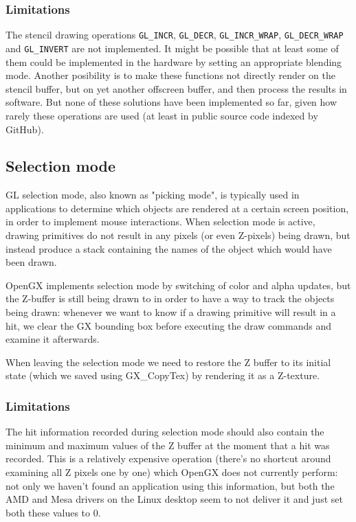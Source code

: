 \documentclass[12pt]{article}
\begin{document}
\subsubsection {Limitations}
\label{sec:stencillimitations}

The stencil drawing operations \lstinline{GL_INCR}, \lstinline{GL_DECR}, \lstinline{GL_INCR_WRAP}, \lstinline{GL_DECR_WRAP} and \lstinline{GL_INVERT} are not implemented. It might be possible that at least some of them could be implemented in the hardware by setting an appropriate blending mode. Another posibility is to make these functions not directly render on the stencil buffer, but on yet another offscreen buffer, and then process the results in software. But none of these solutions have been implemented so far, given how rarely these operations are used (at least in public source code indexed by GitHub).


\subsection {Selection mode}

GL selection mode, also known as "picking mode", is typically used in applications to determine which objects are rendered at a certain screen position, in order to implement mouse interactions. When selection mode is active, drawing primitives do not result in any pixels (or even Z-pixels) being drawn, but instead produce a stack containing the names of the object which would have been drawn.

OpenGX implements selection mode by switching of color and alpha updates, but the Z-buffer is still being drawn to in order to have a way to track the objects being drawn: whenever we want to know if a drawing primitive will result in a hit, we clear the GX bounding box before executing the draw commands and examine it afterwards.

When leaving the selection mode we need to restore the Z buffer to its initial state (which we saved using GX\_CopyTex) by rendering it as a Z-texture.

\subsubsection {Limitations}

The hit information recorded during selection mode should also contain the minimum and maximum values of the Z buffer at the moment that a hit was recorded. This is a relatively expensive operation (there's no shortcut around examining all Z pixels one by one) which OpenGX does not currently perform: not only we haven't found an application using this information, but both the AMD and Mesa drivers on the Linux desktop seem to not deliver it and just set both these values to 0.
\end{document}
